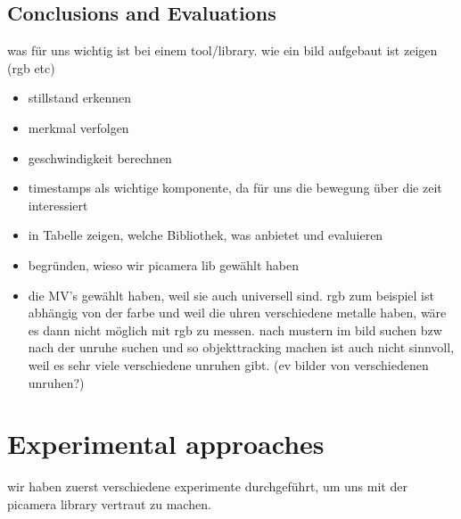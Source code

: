\documentclass[12pt, a4paper]{report}
\begin{document}
   \section{Conclusions and Evaluations}
       was für uns wichtig ist bei einem tool/library. wie ein bild aufgebaut ist zeigen (rgb etc)
    \begin{itemize}
        \item stillstand erkennen
        \item merkmal verfolgen
        \item geschwindigkeit berechnen
        \item timestamps als wichtige komponente, da für uns die bewegung über die zeit interessiert
        \item in Tabelle zeigen, welche Bibliothek, was anbietet und evaluieren
        \item begründen, wieso wir picamera lib gewählt haben
        \item die MV's gewählt haben, weil sie auch universell sind. rgb zum beispiel ist abhängig
        von der farbe und weil die uhren verschiedene metalle haben, wäre es dann nicht möglich mit rgb zu messen. nach mustern im bild suchen bzw nach der unruhe suchen
        und so objekttracking machen ist auch nicht sinnvoll, weil es sehr viele verschiedene unruhen gibt. (ev bilder von verschiedenen unruhen?)
    \end{itemize}
    

    \chapter {Experimental approaches}
    wir haben zuerst verschiedene experimente durchgeführt, um uns mit der picamera library vertraut zu machen. 
\end{document}
